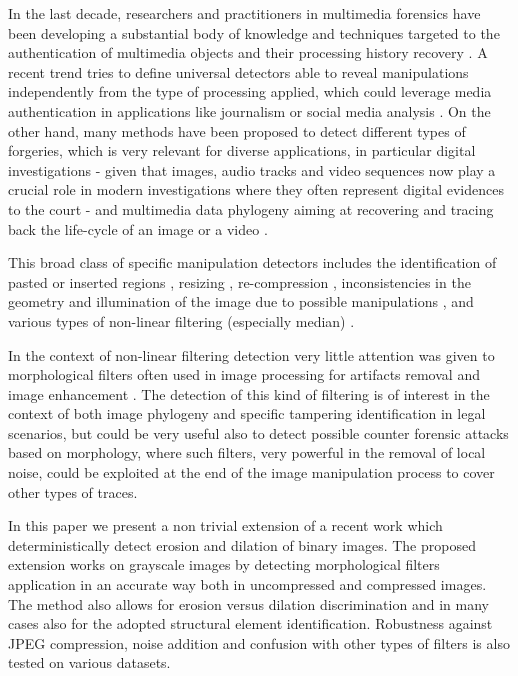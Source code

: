\documentclass[review]{elsarticle}
\begin{document}
In the last decade, researchers and practitioners in multimedia forensics have been developing a substantial body of knowledge and techniques targeted to the authentication of multimedia objects and their processing history recovery \cite{stamm_overview, farid_book, ho, piva_overview, sencar_book}. 
A recent trend tries to define universal detectors able to reveal manipulations independently from the type of processing applied, which could leverage media authentication in applications like journalism or social media analysis \cite{noiseprint}. 
On the other hand, many methods have been proposed to detect different types of forgeries, which is very relevant for diverse applications, in particular digital investigations - given that images, audio tracks and video sequences now play a crucial role in modern investigations where they often represent digital evidences to the court \cite{forlab} - and multimedia data phylogeny aiming at recovering and tracing back the life-cycle of an image or a video \cite{Bestagini2016, Dias2012, Oliveira2016, Costa2014}.

This broad class of specific manipulation detectors includes the identification of pasted or inserted regions \cite{cm2, cm3, cm4, spl2, spl3}, resizing \cite{fernando2017}, re-compression \cite{PBPG2017-TIFS},  inconsistencies in the geometry and illumination of the image due to possible manipulations \cite{geom1, geom2, phys1}, and various types of non-linear filtering (especially median) \cite{Bahrami2015, Cao2014, Cao2011, Fridrich2010, Tian2010, Yuan:2011, Liu2013, Huang2013, Shi2014, Wang2015}. 

In the context of non-linear filtering detection 
very little attention was given to morphological filters \cite{haas1967morphologie} often used in image processing for artifacts removal and image enhancement \cite{British2012} \cite{Maragos2004}. The detection of this kind of filtering is of interest in the context of both image phylogeny and specific tampering identification in legal scenarios, but could be very useful also to detect possible counter forensic attacks based on morphology, where such filters, very powerful in the removal of local noise, could be exploited at the end of the image manipulation process to cover other types of traces. 

In this paper we present a non trivial extension of a recent work \cite{de2017detecting} which deterministically detect erosion and dilation of binary images. The proposed extension works on grayscale images by detecting morphological filters application in an accurate way both in uncompressed and compressed images. The method also allows for erosion versus dilation discrimination and in many cases also for the adopted structural element identification. %
Robustness against JPEG compression, noise addition and confusion with other types of filters is also tested on various datasets. 
\end{document}
